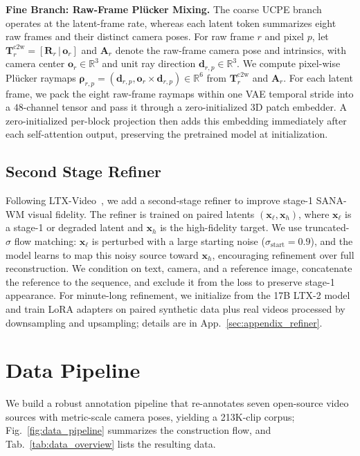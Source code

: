 \documentclass{llmxive}
\providecommand{\modelname}{SANA-WM\xspace}
\begin{document}
\noindent \textbf{Fine Branch: Raw-Frame Pl\"ucker Mixing.}
The coarse UCPE branch operates at the latent-frame rate, whereas each latent token summarizes eight raw frames and their distinct camera poses.
For raw frame $r$ and pixel $p$, let $\mathbf{T}^{\mathrm{c2w}}_r=[\mathbf{R}_r\,|\,\mathbf{o}_r]$ and $\mathbf{A}_r$ denote the raw-frame camera pose and intrinsics, with camera center $\mathbf{o}_{r}\in\mathbb{R}^{3}$ and unit ray direction $\mathbf{d}_{r,p}\in\mathbb{R}^{3}$.
We compute pixel-wise Pl\"ucker raymaps $\boldsymbol{\rho}_{r,p}=(\mathbf{d}_{r,p},\mathbf{o}_{r}\times\mathbf{d}_{r,p})\in\mathbb{R}^{6}$ from $\mathbf{T}^{\mathrm{c2w}}_r$ and $\mathbf{A}_r$.
For each latent frame, we pack the eight raw-frame raymaps within one VAE temporal stride into a $48$-channel tensor and pass it through a zero-initialized 3D patch embedder.
A zero-initialized per-block projection then adds this embedding immediately after each self-attention output, preserving the pretrained model at initialization.


\subsection{Second Stage Refiner}
\label{sec:refiner}
Following LTX-Video~\citep{ltx_video}, we add a second-stage refiner to improve stage-1 \modelname visual fidelity. 
The refiner is trained on paired latents $(\mathbf{x}_{\ell},\mathbf{x}_{h})$, where $\mathbf{x}_{\ell}$ is a stage-1 or degraded latent and $\mathbf{x}_{h}$ is the high-fidelity target. 
We use truncated-$\sigma$ flow matching: $\mathbf{x}_{\ell}$ is perturbed with a large starting noise ($\sigma_{\mathrm{start}}=0.9$), and the model learns to map this noisy source toward $\mathbf{x}_{h}$, encouraging refinement over full reconstruction. 
We condition on text, camera, and a reference image, concatenate the reference to the sequence, and exclude it from the loss to preserve stage-1 appearance. 
For minute-long refinement, we initialize from the 17B LTX-2 model and train LoRA adapters on paired synthetic data plus real videos processed by downsampling and upsampling; details are in App.~\ref{sec:appendix_refiner}.

\section{Data Pipeline}
\label{sec:data_pipeline}

We build a robust annotation pipeline that re-annotates seven open-source video sources with metric-scale camera poses, yielding a 213K-clip corpus; Fig.~\ref{fig:data_pipeline} summarizes the construction flow, and Tab.~\ref{tab:data_overview} lists the resulting data.
\end{document}

